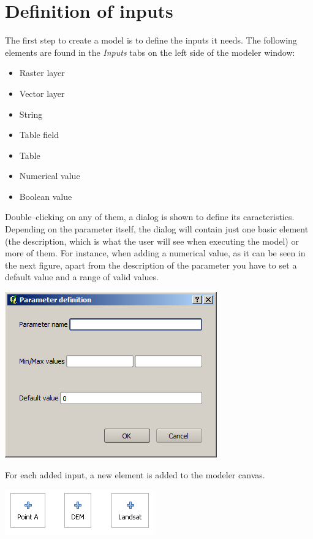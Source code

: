 \section{Definition of inputs}

The first step to create a model is to define the inputs it needs. The following elements are found in the \emph{Inputs} tabs on the left side of the modeler window:

\begin{itemize}
	\item Raster layer
	\item Vector layer 
	\item String
	\item Table field
	\item Table
	\item Numerical value 
	\item Boolean value 
\end{itemize}

Double--clicking on any of them, a dialog is shown to define its caracteristics. Depending on the parameter itself, the dialog will contain just one basic element (the description, which is what the user will see when executing the model) or more of them. For instance, when adding a numerical value, as it can be seen in the next figure, apart from the description of the parameter you have to set a default value and a range of valid values.

\begin{center}
\includegraphics[width=.55\columnwidth]{models_parameters.png}
\end{center}

For each added input, a new element is added to the modeler canvas.

\begin{center}
\includegraphics[width=.4\columnwidth]{models_parameters2.png}
\end{center}

